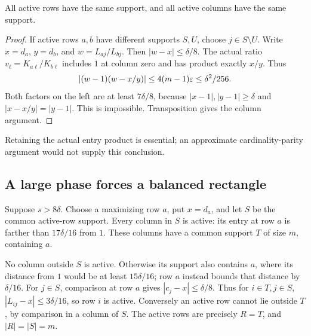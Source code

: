 \begin{lemma}\label{lem:common}
All active rows have the same support, and all active columns have the same support.
\end{lemma}
\begin{proof}
If active rows $a,b$ have different supports $S,U$, choose $j\in S\setminus U$. Write $x=d_a$, $y=d_b$, and $w=L_{aj}/L_{bj}$. Then $|w-x|\le\delta/8$. The actual ratio $v_\ell=K_{a\ell}/K_{b\ell}$ includes $1$ at column zero and has product exactly $x/y$. Thus
\[
 |(w-1)(w-x/y)|\le4(m-1)\varepsilon\le\delta^2/256.
\]
Both factors on the left are at least $7\delta/8$, because $|x-1|,|y-1|\ge\delta$ and $|x-x/y|=|y-1|$. This is impossible. Transposition gives the column argument.
\end{proof}
Retaining the actual entry product is essential; an approximate cardinality-parity argument would not supply this conclusion.

\subsection{A large phase forces a balanced rectangle}\label{subsec:rectangle}
Suppose $s>8\delta$. Choose a maximizing row $a$, put $x=d_a$, and let $S$ be the common active-row support. Every column in $S$ is active: its entry at row $a$ is farther than $17\delta/16$ from $1$. These columns have a common support $T$ of size $m$, containing $a$.

No column outside $S$ is active. Otherwise its support also contains $a$, where its distance from $1$ would be at least $15\delta/16$; row $a$ instead bounds that distance by $\delta/16$. For $j\in S$, comparison at row $a$ gives $|c_j-x|\le\delta/8$. Thus for $i\in T,j\in S$, $|L_{ij}-x|\le3\delta/16$, so row $i$ is active. Conversely an active row cannot lie outside $T$, by comparison in a column of $S$. The active rows are precisely $R=T$, and $|R|=|S|=m$.


